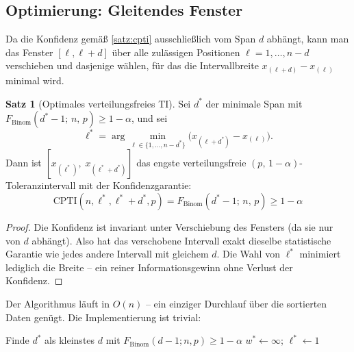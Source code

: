 \documentclass[10pt,a4paper,twocolumn]{article}
\theoremstyle{definition}
\newtheorem{satz}[definition]{Satz}
\begin{document}
\subsection{Optimierung: Gleitendes Fenster}
\label{sec:optimierung}

Da die Konfidenz gemäß \cref{satz:cpti} ausschließlich vom Span $d$
abhängt, kann man das Fenster $[\ell, \ell + d]$ über alle zulässigen
Positionen $\ell = 1, \ldots, n - d$ verschieben und dasjenige wählen,
für das die Intervallbreite $x_{(\ell+d)} - x_{(\ell)}$ minimal wird.

\begin{satz}[Optimales verteilungsfreies TI]
\label{satz:opt_df}
Sei $d^*$ der minimale Span mit
$F_{\mathrm{Binom}}(d^* - 1;\, n,\, p) \geq 1 - \alpha$,
und sei
\[
    \ell^* = \arg\min_{\ell \in \{1,\ldots,n-d^*\}}
        \big(x_{(\ell + d^*)} - x_{(\ell)}\big).
\]
Dann ist $[x_{(\ell^*)},\; x_{(\ell^* + d^*)}]$ das engste
verteilungsfreie $(p,\,1{-}\alpha)$-Toleranzintervall mit der
Konfidenzgarantie:
\[
    \mathrm{CPTI}(n, \ell^*, \ell^* + d^*, p) = F_{\mathrm{Binom}}(d^* - 1;\, n,\, p) \geq 1-\alpha
\]
\end{satz}

\begin{proof}
Die Konfidenz ist invariant unter Verschiebung des Fensters (da sie nur
von $d$ abhängt). Also hat das verschobene Intervall exakt dieselbe
statistische Garantie wie jedes andere Intervall mit gleichem $d$.
Die Wahl von $\ell^*$ minimiert lediglich die Breite -- ein reiner
Informationsgewinn ohne Verlust der Konfidenz.
\end{proof}

Der Algorithmus läuft in $O(n)$ -- ein einziger Durchlauf über die
sortierten Daten genügt. Die Implementierung ist trivial:

\begin{algorithm}
\caption{Optimales verteilungsfreies TI}
\label{alg:opt_df}
Finde $d^*$ als kleinstes $d$ mit $F_{\text{Binom}}(d-1; n, p) \geq 1-\alpha$\;
$w^* \leftarrow \infty$; $\ell^* \leftarrow 1$\;
\end{algorithm}
\end{document}
